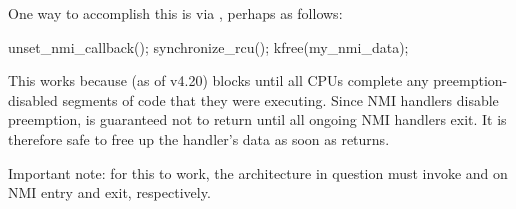 One way to accomplish this is via , perhaps as
follows:

\begin{VerbatimU}
	unset_nmi_callback();
	synchronize_rcu();
	kfree(my_nmi_data);
\end{VerbatimU}

This works because (as of v4.20)  blocks until all
CPUs complete any preemption-disabled segments of code that they were
executing.
Since NMI handlers disable preemption,  is guaranteed
not to return until all ongoing NMI handlers exit.
It is therefore safe
to free up the handler's data as soon as  returns.

\begin{Note}
  Important note{:} for this to work, the architecture in question must
  invoke  and  on NMI entry and exit,
  respectively.
\end{Note}
